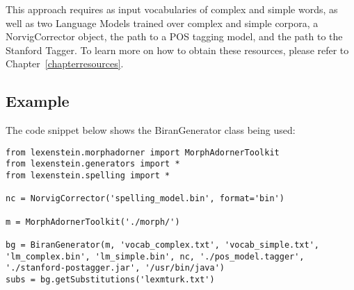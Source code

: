 This approach requires as input vocabularies of complex and simple words, as well as two Language Models trained over complex and simple corpora, a NorvigCorrector object, the path to a POS tagging model, and the path to the Stanford Tagger. To learn more on how to obtain these resources, please refer to Chapter~\ref{chapterresources}.

\subsection{Example}

The code snippet below shows the BiranGenerator class being used:

\begin{lstlisting}
from lexenstein.morphadorner import MorphAdornerToolkit
from lexenstein.generators import *
from lexenstein.spelling import *

nc = NorvigCorrector('spelling_model.bin', format='bin')

m = MorphAdornerToolkit('./morph/')

bg = BiranGenerator(m, 'vocab_complex.txt', 'vocab_simple.txt', 'lm_complex.bin', 'lm_simple.bin', nc, './pos_model.tagger', './stanford-postagger.jar', '/usr/bin/java')
subs = bg.getSubstitutions('lexmturk.txt')
\end{lstlisting}